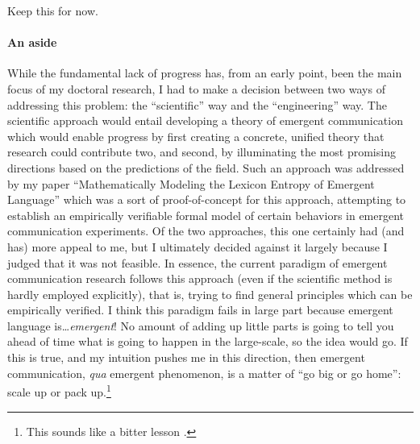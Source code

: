 
\iffalse Keep this for now.
\paragraph{An aside}
While the fundamental lack of progress has, from an early point, been the main focus of my doctoral research, I had to make a decision between two ways of addressing this problem: the ``scientific'' way and the ``engineering'' way.
The scientific approach would entail developing a theory of emergent communication which would enable progress by first creating a concrete, unified theory that research could contribute two, and second, by illuminating the most promising directions based on the predictions of the field.
Such an approach was addressed by my paper ``Mathematically Modeling the Lexicon Entropy of Emergent Language'' \citep{boldt2023mathmodel} which was a sort of proof-of-concept for this approach, attempting to establish an empirically verifiable formal model of certain behaviors in emergent communication experiments.
Of the two approaches, this one certainly had (and has) more appeal to me, but I ultimately decided against it largely because I judged that it was not feasible.
In essence, the current paradigm of emergent communication research follows this approach (even if the scientific method is hardly employed explicitly), that is, trying to find general principles which can be empirically verified.
I think this paradigm fails in large part because emergent language is\dots\emph{emergent}!
No amount of adding up little parts is going to tell you ahead of time what is going to happen in the large-scale, so the idea would go.
If this is true, and my intuition pushes me in this direction, then emergent communication, \emph{qua} emergent phenomenon, is a matter of ``go big or go home'': scale up or pack up.\footnote{This sounds like a bitter lesson \citep{bitter-lesson}.}

